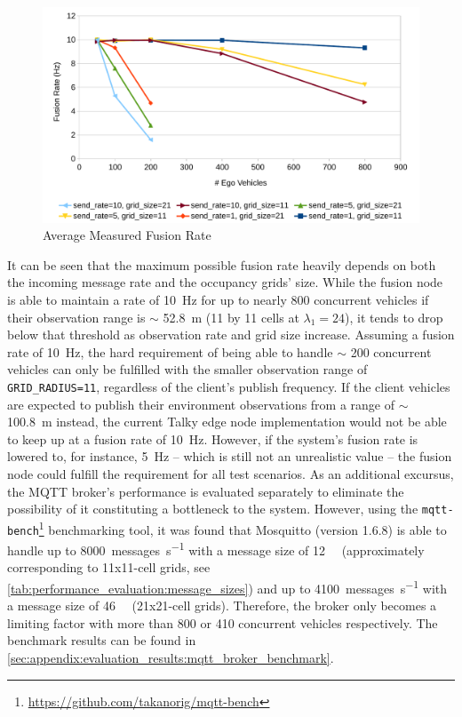 \begin{figure}
	\centering
	\includegraphics[width=1.0\linewidth]{98_images/performance_evaluation_chart1}
	\caption{Average Measured Fusion Rate}
	\label{fig:performance_evaluation:fusion_rates}
\end{figure}

It can be seen that the maximum possible fusion rate heavily depends on both the incoming message rate and the occupancy grids' size. While the fusion node is able to maintain a rate of \SI{10}{\hertz} for up to nearly 800 concurrent vehicles if their observation range is $\sim$ \SI{52.8}{\meter} (11 by 11 cells at $\lambda_1 = 24$), it tends to drop below that threshold as observation rate and grid size increase. Assuming a fusion rate of \SI{10}{\hertz}, the hard requirement of being able to handle $\sim$ 200 concurrent vehicles can only be fulfilled with the smaller observation range of \texttt{GRID\_RADIUS=11}, regardless of the client's publish frequency. If the client vehicles are expected to publish their environment observations from a range of $\sim$ \SI{100.8}{\meter} instead, the current Talky edge node implementation would not be able to keep up at a fusion rate of \SI{10}{\hertz}. However, if the system's fusion rate is lowered to, for instance, \SI{5}{\hertz} – which is still not an unrealistic value – the fusion node could fulfill the requirement for all test scenarios. As an additional excursus, the MQTT broker's performance is evaluated separately to eliminate the possibility of it constituting a bottleneck to the system. However, using the \texttt{mqtt-bench}\footnote{\url{https://github.com/takanorig/mqtt-bench}} benchmarking tool, it was found that Mosquitto (version 1.6.8) is able to handle up to \SI{8000}{messages\per\second} with a message size of \SI{12}{\kilo\byte} (approximately corresponding to 11x11-cell grids, see \cref{tab:performance_evaluation:message_sizes}) and up to \SI{4100}{messages\per\second} with a message size of \SI{46}{\kilo\byte} (21x21-cell grids). Therefore, the broker only becomes a limiting factor with more than 800 or 410 concurrent vehicles respectively. The benchmark results can be found in \cref{sec:appendix:evaluation_results:mqtt_broker_benchmark}.
\par
\bigskip

